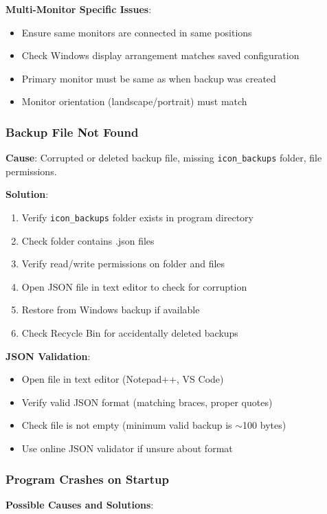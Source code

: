 \documentclass[a4paper,11pt]{article}
\begin{document}
\textbf{Multi-Monitor Specific Issues}:
\begin{itemize}
  \item Ensure same monitors are connected in same positions
  \item Check Windows display arrangement matches saved configuration
  \item Primary monitor must be same as when backup was created
  \item Monitor orientation (landscape/portrait) must match
\end{itemize}

\subsubsection{Backup File Not Found}

\textbf{Cause}: Corrupted or deleted backup file, missing
\texttt{icon\_backups} folder, file permissions.

\textbf{Solution}:
\begin{enumerate}
  \item Verify \texttt{icon\_backups} folder exists in program directory
  \item Check folder contains .json files
  \item Verify read/write permissions on folder and files
  \item Open JSON file in text editor to check for corruption
  \item Restore from Windows backup if available
  \item Check Recycle Bin for accidentally deleted backups
\end{enumerate}

\textbf{JSON Validation}:
\begin{itemize}
  \item Open file in text editor (Notepad++, VS Code)
  \item Verify valid JSON format (matching braces, proper quotes)
  \item Check file is not empty (minimum valid backup is $\sim$100 bytes)
  \item Use online JSON validator if unsure about format
\end{itemize}

\subsubsection{Program Crashes on Startup}

\textbf{Possible Causes and Solutions}:
\end{document}
